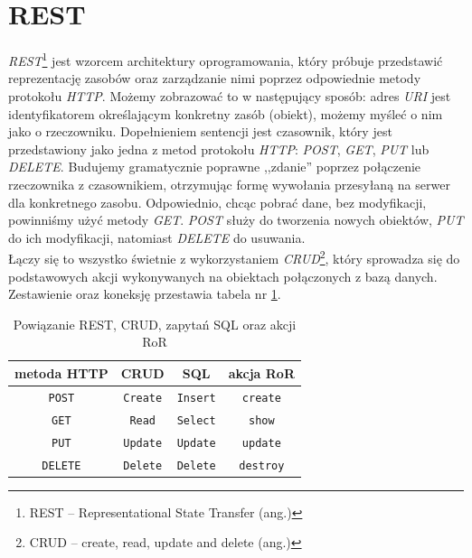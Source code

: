 \documentclass[12pt,twoside]{report}
\begin{document}
\section{REST}\label{sec:rest}
\emph{REST}\footnote{REST -- Representational State Transfer (ang.)} jest wzorcem
architektury oprogramowania, który próbuje przedstawić reprezentację zasobów oraz
zarządzanie nimi poprzez odpowiednie metody protokołu \emph{HTTP}. Możemy zobrazować to w
następujący sposób: adres \emph{URI} jest identyfikatorem określającym konkretny zasób
(obiekt), możemy myśleć o nim jako o rzeczowniku. Dopełnieniem sentencji jest czasownik,
który jest przedstawiony jako jedna z metod protokołu \emph{HTTP}: \emph{POST}, \emph{GET},
\emph{PUT} lub \emph{DELETE}. Budujemy gramatycznie poprawne ,,zdanie'' poprzez
połączenie rzeczownika z czasownikiem, otrzymując formę wywołania przesyłaną na serwer dla
konkretnego zasobu. Odpowiednio, chcąc pobrać dane, bez modyfikacji, powinniśmy użyć
metody \emph{GET}. \emph{POST} służy do tworzenia nowych obiektów, \emph{PUT} do ich
modyfikacji, natomiast \emph{DELETE} do usuwania.\\
Łączy się to wszystko świetnie z wykorzystaniem \emph{CRUD}\footnote{CRUD -- create, read,
update and delete (ang.)}, który sprowadza się do podstawowych akcji wykonywanych na
obiektach połączonych z bazą danych. Zestawienie oraz koneksję przestawia tabela nr
\ref{table:rest}.

\begin{table}[htcb]
  \begin{center}
    \begin{tabular}{|c|c|c|c|}
      \hline
      \textbf{metoda HTTP} & \textbf{CRUD} & \textbf{SQL} & \textbf{akcja RoR}\\
      \hline
      \texttt{POST} & \texttt{Create} & \texttt{Insert} & \texttt{create}\\
      \texttt{GET} & \texttt{Read} & \texttt{Select} & \texttt{show}\\
      \texttt{PUT} & \texttt{Update} & \texttt{Update} & \texttt{update}\\
      \texttt{DELETE} & \texttt{Delete} & \texttt{Delete} & \texttt{destroy}\\
      \hline
    \end{tabular}
  \end{center}
  \caption{Powiązanie REST, CRUD, zapytań SQL oraz akcji RoR}
  \label{table:rest}
\end{table}
\end{document}

